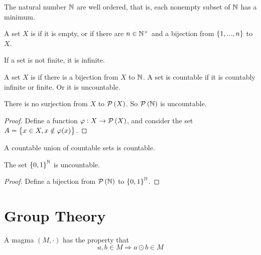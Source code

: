 \begin{theorem}
    The natural number $\mathbb{N}$ are well ordered, that is, each nonempty subset of $\mathbb{N}$ has a minimum.
\end{theorem}


\begin{definition}
    A set $X$ is  if it is empty, or if there are $n \in \mathbb{N}^{\times}$ and a bijection from $\set{1, ..., n}$ to $X$.
    
    If a set is not finite, it is infinite.
    
    A set $X$ is  if there is a bijection from $X$ to $\mathbb{N}$. A set is countable if it is countably infinite or finite. Or it is uncountable.
\end{definition}

\begin{theorem}
    There is no surjection from $X$ to $\mathcal{P}\left( X \right)$. So $\mathcal{P}\left( \mathbb{N} \right)$ is uncountable.
\end{theorem}
\begin{proof}
    Define a function $\varphi: X \rightarrow \mathcal{P}\left( X \right)$, and consider the set $A = \set{x\in X, x \notin \varphi(x)}$.
\end{proof}


\begin{theorem}
A countable union of countable sets is countable.    
\end{theorem}

\begin{theorem}
The set $\set{0,1}^{\mathbb{N}}$ is uncountable.
\end{theorem}
\begin{proof}
    Define a bijection from $\mathcal{P}\left( \mathbb{N} \right)$ to $\set{0,1}^{\mathbb{N}}$.
\end{proof}


\section{Group Theory}

%
%

\begin{definition}
    A magma $(M, \cdot)$ has the property that
    \begin{equation}
        a, b \in M \Rightarrow a \odot b \in M
    \end{equation}
\end{definition}

